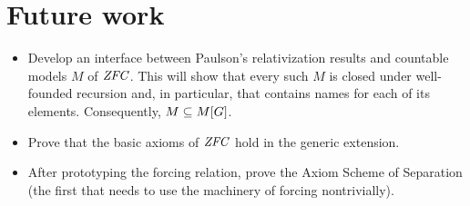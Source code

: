 \section{Future work}
\begin{itemize}
\item Develop an interface between Paulson's relativization results
  and countable models $M$ of $\mathit{ZFC}$. This will show
  that every such $M$ is closed under well-founded recursion and, in
  particular, that contains names for each of its
  elements. Consequently, $M\subseteq M[G]$.
\item Prove that the basic axioms of $\mathit{ZFC}$ hold in the generic
  extension. 
\item After prototyping the forcing relation, prove the Axiom Scheme
  of Separation (the first that needs to use the machinery of forcing
  nontrivially).
\end{itemize}

